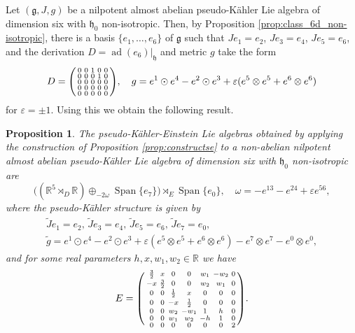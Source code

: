 \documentclass{article}
\newtheorem{proposition}[theorem]{Proposition}
\theoremstyle{definition}
\DeclareMathOperator{\ad}{ad}
\newcommand{\R}{\mathbb{R}}
\newcommand{\frg}{\mathfrak{g}}
\newcommand{\frh}{\mathfrak{h}}
\newcommand{\Span}[1]{\operatorname{Span}\{#1\}}
\newenvironment{smallpmatrix}{\left(\begin{smallmatrix}}{\end{smallmatrix}\right)}
\begin{document}
Let $(\frg,J,g)$ be a nilpotent almost abelian pseudo-Kähler Lie algebra of dimension six with $\frh_0$ non-isotropic. Then, by Proposition \ref{prop:class_6d_non-isotropic}, there is a basis $\{e_1,\ldots,e_6\}$ of $\frg$ such that $Je_1=e_2$, $Je_3=e_4$, $Je_5=e_6$, and the derivation $D=\ad(e_6)|_\frh$ and metric $g$ take the form \begin{equation}\label{eq:6d_nilpotent_non-isotropic}
D=\begin{smallpmatrix}
    0 & 0 & 1 & 0 & 0 \\
    0 & 0 & 0 & 1 & 0 \\
    0 & 0 & 0 & 0 & 0 \\
    0 & 0 & 0 & 0 & 0 \\
    0 & 0 & 0 & 0 & 0
\end{smallpmatrix},\quad g=e^1\odot e^4-e^2\odot e^3+\varepsilon(e^5\otimes e^5+e^6\otimes e^6)\end{equation} for $\varepsilon=\pm1$. Using this we obtain the following result.

\begin{proposition}\label{prop:KEextension6d_non_isotropic}
    The pseudo-Kähler-Einstein Lie algebras obtained by applying the construction of Proposition \ref{prop:constructse} to a non-abelian nilpotent almost abelian pseudo-Kähler Lie algebra of dimension six with $\frh_0$ non-isotropic are \begin{equation}\label{eqn:explicitKEext_noniso}
        \bigl((\R^5\rtimes_D\R)\oplus_{-2\omega}\Span{e_7}\bigr)\rtimes_{E}\Span{e_0},\quad \omega=-e^{13}-e^{24}+\varepsilon e^{56},
    \end{equation} where the pseudo-Kähler structure is given by \begin{gather*}
        \tilde{J}e_1=e_2,\,\tilde{J}e_3=e_4,\,\tilde{J}e_5=e_6,\,\tilde{J}e_7=e_0,\\
        \tilde{g}=e^1\odot e^4-e^2\odot e^3+\varepsilon(e^5\otimes e^5+e^6\otimes e^6)-e^7\otimes e^7-e^0\otimes e^0,
    \end{gather*} and for some real parameters $h,x,w_1,w_2\in\R$ we have $$E=\begin{smallpmatrix}
        \frac{3}{2} & x & 0 & 0 & w_1 & -w_2 & 0\\
        -x & \frac{3}{2} & 0 & 0 & w_2 & w_1 & 0\\
        0 & 0 & \frac{1}{2} & x & 0 & 0 & 0\\
        0 & 0 & -x & \frac{1}{2} & 0 & 0 & 0\\
        0 & 0 & w_2 & -w_1 & 1 & h & 0\\
        0 & 0 & w_1 & w_2 & -h & 1 & 0\\
        0 & 0 & 0 & 0 & 0 & 0 & 2\\
    \end{smallpmatrix}.$$
\end{proposition}
\end{document}
